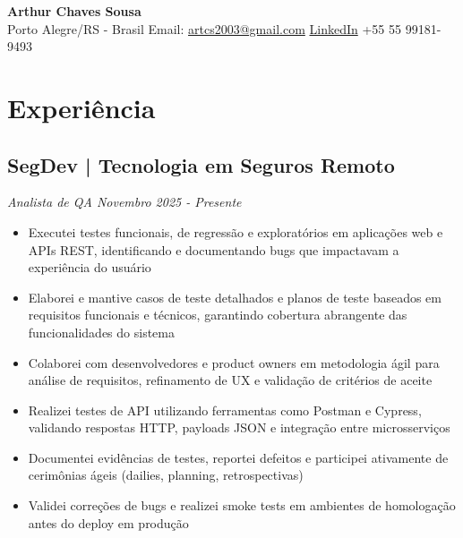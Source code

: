 \documentclass[a4paper,10pt]{article}
\begin{document}
\begin{center}
    {\LARGE \textbf{Arthur Chaves Sousa}} 
    \\ [0.1cm]
    Porto Alegre/RS - Brasil
    {\textbullet}
    Email: \href{mailto:artcs2003@gmail.com}{artcs2003@gmail.com} 
    {\textbullet}
    \href{https://www.linkedin.com/in/artcs14}{LinkedIn} 
    {\textbullet}
    +55 55 99181-9493
\end{center}


\section{Experiência}
    \subsection*{\texorpdfstring{
            \textbf{SegDev | Tecnologia em Seguros} \hfill Remoto
        }{
            Segdev | Tecnologia em Seguros -- Remoto
        }}
    \textit{Analista de QA \hfill Novembro 2025 - Presente}
        \begin{itemize}
            \item Executei testes funcionais, de regressão e exploratórios em aplicações web e APIs REST, identificando e documentando bugs que impactavam a experiência do usuário
            \item Elaborei e mantive casos de teste detalhados e planos de teste baseados em requisitos funcionais e técnicos, garantindo cobertura abrangente das funcionalidades do sistema
            \item Colaborei com desenvolvedores e product owners em metodologia ágil  para análise de requisitos, refinamento de UX e validação de critérios de aceite
            \item Realizei testes de API utilizando ferramentas como Postman e Cypress, validando respostas HTTP, payloads JSON e integração entre microsserviços
            \item Documentei evidências de testes, reportei defeitos e participei ativamente de cerimônias ágeis (dailies, planning, retrospectivas)
            \item Validei correções de bugs e realizei smoke tests em ambientes de homologação antes do deploy em produção
        \end{itemize}
\end{document}
